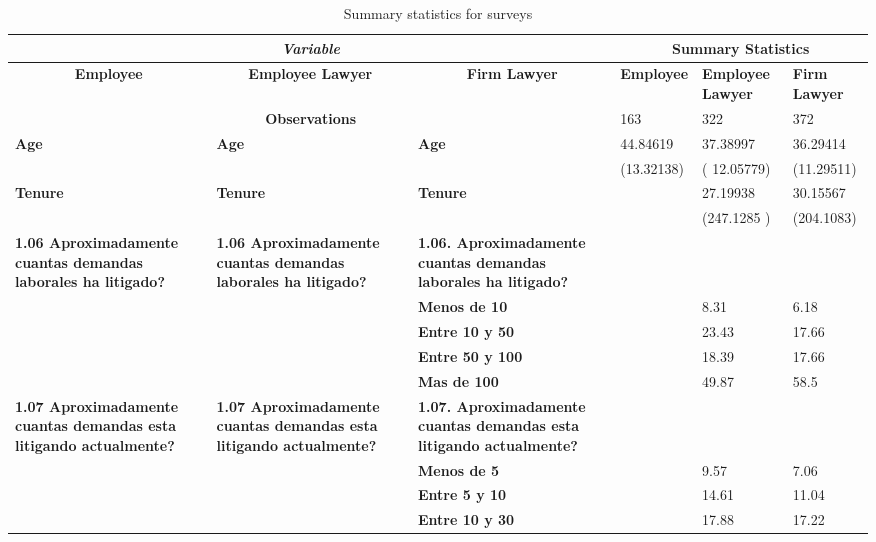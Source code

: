 \begin{longtable}{p{3cm}p{3cm}p{3cm}p{1.5cm}p{1.5cm}p{1.5cm}}
\caption{Summary statistics for surveys} \\
\toprule
\multicolumn{3}{c}{\textit{\textbf{Variable}}} & \multicolumn{3}{c}{\textbf{Summary Statistics }} \\
\midrule
\multicolumn{1}{c}{\textbf{Employee}} & \multicolumn{1}{c}{\textbf{Employee Lawyer}} & \multicolumn{1}{c}{\textbf{Firm Lawyer}} & \textbf{Employee} & \textbf{Employee Lawyer} & \textbf{Firm Lawyer} \\
\midrule
\midrule
\multicolumn{3}{c}{\textbf{Observations}} & 163   & 322   & 372 \\
\midrule
\textbf{Age} & \textbf{Age} & \textbf{Age} & 44.84619 & 37.38997 & 36.29414 \\
\textbf{} & \textbf{} & \textbf{} & (13.32138) & ( 12.05779) & (11.29511) \\
\textbf{Tenure} & \textbf{Tenure} & \textbf{Tenure} &       & 27.19938 & 30.15567 \\
\textbf{} & \textbf{} & \textbf{} &       & (247.1285 ) & (204.1083) \\
\textbf{1.06 Aproximadamente cuantas demandas laborales ha litigado?} & \textbf{1.06 Aproximadamente cuantas demandas laborales ha litigado?} & \textbf{1.06. Aproximadamente cuantas demandas laborales ha litigado? } &       &       &  \\
\textbf{ } & \textbf{ } & \textbf{Menos de 10 } &       & 8.31  & 6.18 \\
\textbf{ } & \textbf{ } & \textbf{ Entre 10 y 50 } &       & 23.43 & 17.66 \\
\textbf{ } & \textbf{ } & \textbf{Entre 50 y 100 } &       & 18.39 & 17.66 \\
\textbf{ } & \textbf{ } & \textbf{Mas de 100 } &       & 49.87 & 58.5 \\
\textbf{1.07 Aproximadamente cuantas demandas esta litigando actualmente?} & \textbf{1.07 Aproximadamente cuantas demandas esta litigando actualmente?} & \textbf{1.07. Aproximadamente cuantas demandas esta litigando actualmente?} &       &       &  \\
\textbf{ } & \textbf{ } & \textbf{ Menos de 5 } &       & 9.57  & 7.06 \\
\textbf{ } & \textbf{ } & \textbf{ Entre 5 y 10 } &       & 14.61 & 11.04 \\
\textbf{ } & \textbf{ } & \textbf{Entre 10 y 30 } &       & 17.88 & 17.22 \\

\end{longtable}
